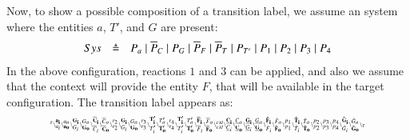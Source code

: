 Now, to show a possible composition of a transition label, we assume an system where the entities $a$, $T'$, and $G$ are present:
\[
\begin{array}{lcl}
Sys &\defeq &%
P_a\mid \overline{P}_C\mid P_G\mid \overline{P}_F \mid \overline{P}_T \mid P_{T'} \mid P_1 \mid P_2 \mid P_3 \mid P_4
\end{array}
\]
In the above configuration, reactions $1$ and $3$ can be applied, and also we assume that the context will provide the entity $F$, that will be available in the target configuration.
The transition label appears as:
\[
\tiny
\begin{array}{l}
 {}^{\tau}\backslash_{a_i}^{\bf  a_i}\backslash_{\bf a_o}^{a_o}
 \backslash_{G_i}^{\bf  G_i}\backslash_{\bf G_o}^{G_o}
 \backslash_{\overline{C}_i}^{\bf \overline{C}_i}\backslash_{\bf \overline{C}_o}^{\overline{C}_o}
 \backslash_{r_2}^{r_2}\backslash_{G_i}^{\bf G_i}\backslash_{\bf G_o}^{G_o}
\backslash_{r_3}^{r_3}\backslash_{T'_i}^{\bf T'_i}\backslash_{\bf T'_o}^{T'_o}\backslash_{r_4}^{r_4}\backslash_{T'_i}^{\bf T'_i}\backslash_{\bf T'_o}^{T'_o}\backslash_{\overline{F}_i}^{\bf \overline{F}_i}\backslash_{\bf \overline{F}_o}^{\overline{F}_o}\backslash_{cxt}^{cxt}
\backslash_{\underline{C}_i}^{\bf \underline{C}_i}\backslash_{\bf \underline{C}_o}^{\underline{C}_o}
\backslash_{\underline{G}_i}^{\bf \underline{G}_i}\backslash_{\bf \underline{G}_o}^{\underline{G}_o}
\backslash_{\hat{F}_i}^{\bf \hat{F}_i}\backslash_{\bf \hat{F}_o}^{\hat{F}_o}\backslash_{p_1}^{p_1} 
 \backslash_{\tilde{T}_i}^{\bf \tilde{T}_i}\backslash_{\bf \tilde{T}_o}^{\tilde{T}_o}
  \backslash_{p_2}^{p_2}\backslash_{p_3}^{p_3}\backslash_{p_4}^{p_4} \backslash_{\tilde{G}_i}^{\bf \tilde{G}_i}\backslash_{\bf \tilde{G}_o}^{\tilde{G}_o} \backslash_{\tau}
\end{array}
\]



